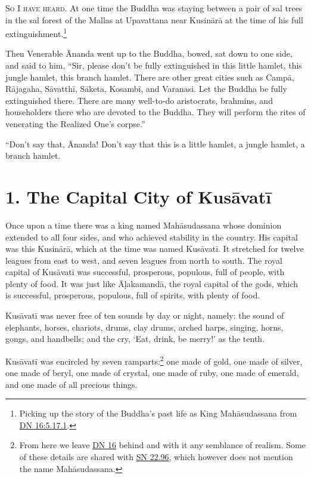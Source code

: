 \documentclass[12pt,openany]{book}%
\newcommand*{\scevam}[1]{\textsc{#1}}
\begin{document}
\scevam{So I have heard. }At one time the Buddha was staying between a pair of sal trees in the sal forest of the Mallas at Upavattana near \textsanskrit{Kusinārā} at the time of his full extinguishment.\footnote{Picking up the story of the Buddha’s past life as King \textsanskrit{Mahāsudassana} from \href{https://suttacentral.net/dn16/en/sujato\#5.17.1}{DN 16:5.17.1}. } 

Then Venerable Ānanda went up to the Buddha, bowed, sat down to one side, and said to him, “Sir, please don’t be fully extinguished in this little hamlet, this jungle hamlet, this branch hamlet. There are other great cities such as \textsanskrit{Campā}, \textsanskrit{Rājagaha}, \textsanskrit{Sāvatthī}, \textsanskrit{Sāketa}, \textsanskrit{Kosambī}, and Varanasi. Let the Buddha be fully extinguished there. There are many well-to-do aristocrats, brahmins, and householders there who are devoted to the Buddha. They will perform the rites of venerating the Realized One’s corpse.” 

“Don’t say that, Ānanda! Don’t say that this is a little hamlet, a jungle hamlet, a branch hamlet. 

\section*{1. The Capital City of \textsanskrit{Kusāvatī} }

Once upon a time there was a king named \textsanskrit{Mahāsudassana} whose dominion extended to all four sides, and who achieved stability in the country. His capital was this \textsanskrit{Kusinārā}, which at the time was named \textsanskrit{Kusāvatī}. It stretched for twelve leagues from east to west, and seven leagues from north to south. The royal capital of \textsanskrit{Kusāvatī} was successful, prosperous, populous, full of people, with plenty of food. It was just like \textsanskrit{Āḷakamandā}, the royal capital of the gods, which is successful, prosperous, populous, full of spirits, with plenty of food. 

\textsanskrit{Kusāvatī} was never free of ten sounds by day or night, namely: the sound of elephants, horses, chariots, drums, clay drums, arched harps, singing, horns, gongs, and handbells; and the cry, ‘Eat, drink, be merry!’ as the tenth. 

\textsanskrit{Kusāvatī} was encircled by seven ramparts:\footnote{From here we leave \href{https://suttacentral.net/dn16/en/sujato}{DN 16} behind and with it any semblance of realism. Some of these details are shared with \href{https://suttacentral.net/sn22.96/en/sujato}{SN 22.96}, which however does not mention the name \textsanskrit{Mahāsudassana}. } one made of gold, one made of silver, one made of beryl, one made of crystal, one made of ruby, one made of emerald, and one made of all precious things. 
\end{document}

